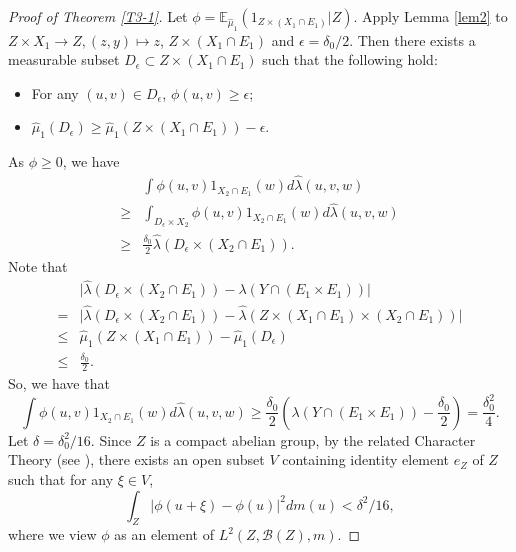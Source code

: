 \documentclass[reqno,12pt]{amsart}
\def \E {\mathbb E}
\def\B {\mathcal B}
\def \ep {\epsilon}
\numberwithin{equation}{section}
\begin{document}
\begin{proof}[Proof of Theorem \ref{T3-1}]
	
	Let $\phi=\E_{\hat{\mu}_1}(1_{Z\times (X_1\cap E_1)}|Z)$. Apply Lemma \ref{lem2} to $Z\times X_1\to Z,(z,y)\mapsto z$, $Z\times (X_1\cap E_1)$ and $\ep=\delta_0/2$. Then there exists a measurable subset $D_{\ep}\subset Z\times (X_1\cap E_1)$ such that the following hold:
		\begin{itemize}
			\item For any $(u,v)\in D_{\ep}$, $\phi(u,v)\ge \ep$;
			\item $\hat{\mu}_1(D_{\ep})\ge \hat{\mu}_1(Z\times (X_1\cap E_1))-\ep$.
		\end{itemize} As $\phi\geq 0$, we have
		\begin{align*}
			& \int\phi(u,v)1_{X_2\cap E_1}(w)d\hat{\lambda}(u,v,w)
			\\ \ge & \int_{D_{\ep}\times X_2}\phi(u,v)1_{X_2\cap E_1}(w)d\hat{\lambda}(u,v,w)
			\\ \ge &
			\frac{\delta_0}{2}\hat{\lambda}(D_{\ep}\times (X_2\cap E_1)).
		\end{align*}
		Note that
		\begin{align*}
		&  \Big|\hat{\lambda}(D_{\ep}\times (X_2\cap E_1))-{\lambda}(Y\cap (E_1\times E_1))\Big|
			\\ = &
			\Big|\hat{\lambda}(D_{\ep}\times (X_2\cap E_1))-\hat{\lambda}(Z\times (X_1\cap E_1)\times (X_2\cap E_1))\Big|
			\\ \le &
			\hat{\mu}_1(Z\times (X_1\cap E_1))-\hat{\mu}_1(D_{\ep})
			\\ \le &
			\frac{\delta_0}{2}.
		\end{align*}
		So, we have that
		\begin{equation}\label{eq3}
			\int\phi(u,v)1_{X_2\cap E_1}(w)d\hat{\lambda}(u,v,w)\ge \frac{\delta_0}{2}({\lambda}(Y\cap (E_1\times E_1))-\frac{\delta_0}{2})=\frac{\delta_0^2}{4}.
		\end{equation}
		Let $\delta=\delta_{0}^{2}/16$. Since $Z$ is a compact abelian group, by the related Character Theory (see \cite{HR}), there exists an open subset $V$ containing identity element $e_{Z}$ of $Z$ such that for any $\xi\in V$,
		\begin{equation}\label{eq1}
			\int_{Z}|\phi(u+\xi)-\phi(u)|^{2}dm(u)<\delta^2/16,
		\end{equation}
		 where we view $\phi$ as an element of $L^{2}(Z,\B(Z),m)$.
		

\end{proof}
\end{document}
